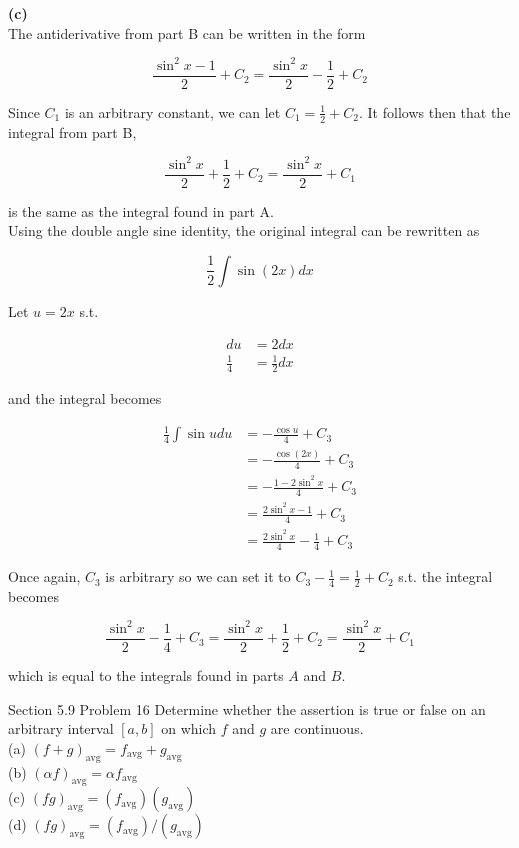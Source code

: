 \documentclass{article}
\begin{document}
    \textbf{(c)} \\
    The antiderivative from part B can be written in the form

    \[
        \frac{\sin^2{x}-1}{2} + C_2 = \frac{\sin^2{x}}{2} - \frac{1}{2} + C_2
    \]

    \pagebreak
    \thispagestyle{4}

    Since $C_1$ is an arbitrary constant, we can let $C_1 = \frac{1}{2}+C_2$. It follows then that the integral from part B,

    \[
        \frac{\sin^2{x}}{2} + \frac{1}{2} + C_2 = \frac{\sin^2{x}}{2} + C_1
    \]

    is the same as the integral found in part A. \\

    Using the double angle sine identity, the original integral can be rewritten as

    \[
        \frac{1}{2}\int \sin{(2x)}dx
    \]

    Let $u=2x$ s.t.

    \begin{align*}
        du  &= 2dx \\
        \frac{1}{4} &= \frac{1}{2}dx
    \end{align*}

    and the integral becomes

    \begin{align*}
        \frac{1}{4}\int \sin{u}du   &= -\frac{\cos{u}}{4} + C_3 \\
                                    &= -\frac{\cos{(2x)}}{4} + C_3 \\
                                    &= -\frac{1-2\sin^2{x}}{4} + C_3 \\
                                    &= \frac{2\sin^2{x}-1}{4} + C_3 \\
                                    &= \frac{2\sin^2{x}}{4} - \frac{1}{4} + C_3
    \end{align*}

    Once again, $C_3$ is arbitrary so we can set it to $C_3-\frac{1}{4}=\frac{1}{2}+C_2$ s.t. the integral becomes

    \[
        \frac{\sin^2{x}}{2} - \frac{1}{4} + C_3 = \frac{\sin^2{x}}{2} + \frac{1}{2}+C_2 = \frac{\sin^2{x}}{2} + C_{1}
    \]

    which is equal to the integrals found in parts $A$ and $B$.


    \begin{tbhtheorem}{Section 5.9 Problem 16}
        Determine whether the assertion is true or false on an arbitrary interval $[a,b]$ on which $f$ and $g$ are continuous. \\
        (a) $(f+g)_{\text{avg}}=f_{\text{avg}}+g_{\text{avg}}$ \\
        (b) $(\alpha f)_{\text{avg}}=\alpha f_{\text{avg}}$ \\
        (c) $\left(fg\right)_{\text{avg}}=\left(f_{\text{avg}}\right)\left(g_{\text{avg}}\right)$ \\
        (d) $\left(fg\right)_{\text{avg}}=\left(f_{\text{avg}}\right)/\left(g_{\text{avg}}\right)$
    \end{tbhtheorem}
\end{document}
